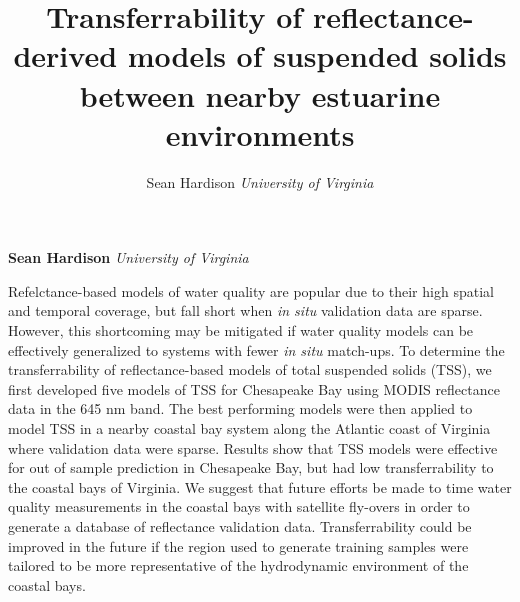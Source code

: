 \documentclass[11pt,]{article}
\title{Transferrability of reflectance-derived models of suspended solids
between nearby estuarine environments  }
\author{\Large Sean Hardison\vspace{0.05in} \newline\normalsize\emph{University of Virginia}  }
\date{}
\newcommand*{\authorfont}{\fontfamily{phv}\selectfont}
\renewenvironment{abstract}
{{%
  \setlength{\leftmargin}{0mm}
  \setlength{\rightmargin}{\leftmargin}%
}%
  \relax}
{\endlist}
\begin{document}
	
%

{%
\setlength{\parindent}{0pt}
\thispagestyle{plain}
{\fontsize{18}{20}\selectfont\raggedright 
\maketitle  %

}

{
   \vskip 13.5pt\relax \normalsize\fontsize{11}{12} 
\textbf{\authorfont Sean Hardison} \hskip 15pt \emph{\small University of Virginia}   

}

}








\begin{abstract}

    \hbox{\vrule height .2pt width 39.14pc}

    \vskip 8.5pt %

\noindent Refelctance-based models of water quality are popular due to their high
spatial and temporal coverage, but fall short when \emph{in situ}
validation data are sparse. However, this shortcoming may be mitigated
if water quality models can be effectively generalized to systems with
fewer \emph{in situ} match-ups. To determine the transferrability of
reflectance-based models of total suspended solids (TSS), we first
developed five models of TSS for Chesapeake Bay using MODIS reflectance
data in the 645 nm band. The best performing models were then applied to
model TSS in a nearby coastal bay system along the Atlantic coast of
Virginia where validation data were sparse. Results show that TSS models
were effective for out of sample prediction in Chesapeake Bay, but had
low transferrability to the coastal bays of Virginia. We suggest that
future efforts be made to time water quality measurements in the coastal
bays with satellite fly-overs in order to generate a database of
reflectance validation data. Transferrability could be improved in the
future if the region used to generate training samples were tailored to
be more representative of the hydrodynamic environment of the coastal
bays.


    \hbox{\vrule height .2pt width 39.14pc}


\end{abstract}
\end{document}
